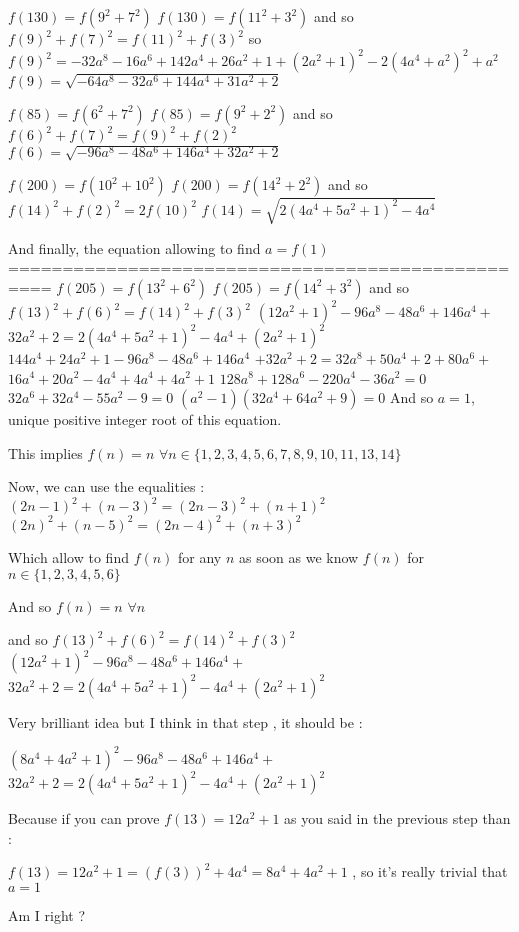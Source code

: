 \begin{solution}
$ f(130)=f(9^2+7^2)$
$ f(130)=f(11^2+3^2)$
and so $ f(9)^2+f(7)^2=f(11)^2+f(3)^2$
so $ f(9)^2=-32a^8-16a^6+142a^4+26a^2+1+(2a^2+1)^2-2(4a^4+a^2)^2+a^2$
$ f(9)=\sqrt{-64a^8-32a^6+144a^4+31a^2+2}$

$ f(85)=f(6^2+7^2)$
$ f(85)=f(9^2+2^2)$
and so $ f(6)^2+f(7)^2=f(9)^2+f(2)^2$
$ f(6)=\sqrt{-96a^8-48a^6+146a^4+32a^2+2}$

$ f(200)=f(10^2+10^2)$
$ f(200)=f(14^2+2^2)$
and so $ f(14)^2+f(2)^2=2f(10)^2$
$ f(14)=\sqrt{2(4a^4+5a^2+1)^2-4a^4}$

And finally, the equation allowing to find $ a=f(1)$
==================================================
$ f(205)=f(13^2+6^2)$
$ f(205)=f(14^2+3^2)$
and so $ f(13)^2+f(6)^2=f(14)^2+f(3)^2$
$ (12a^2+1)^2-96a^8-48a^6+146a^4+$ $ 32a^2+2=2(4a^4+5a^2+1)^2-4a^4+(2a^2+1)^2$
$ 144a^4+24a^2+1-96a^8-48a^6+146a^4$ $ +32a^2+2=32a^8+50a^4+2+80a^6+$ $ 16a^4+20a^2-4a^4+4a^4+4a^2+1$
$ 128a^8+128a^6-220a^4-36a^2=0$
$ 32a^6+32a^4-55a^2-9=0$
$ (a^2-1)(32a^4+64a^2+9)=0$
And so $ a=1$, unique positive integer root of this equation.

This implies $ f(n)=n$ $ \forall n\in\{1,2,3,4,5,6,7,8,9,10,11,13,14\}$

Now, we can use the equalities  :
$ (2n-1)^2+(n-3)^2=(2n-3)^2+(n+1)^2$
$ (2n)^2+(n-5)^2=(2n-4)^2+(n+3)^2$

Which allow to find $ f(n)$ for any $ n$ as soon as we know $ f(n)$ for $ n\in\{1,2,3,4,5,6\}$

And so $ \boxed{f(n)=n}$ $ \forall n$
\end{solution}



\begin{solution}
	\begin{tcolorbox} and so $ f(13)^2 + f(6)^2 = f(14)^2 + f(3)^2$
$ (12a^2 + 1)^2 - 96a^8 - 48a^6 + 146a^4 +$ $ 32a^2 + 2 = 2(4a^4 + 5a^2 + 1)^2 - 4a^4 + (2a^2 + 1)^2$


  \end{tcolorbox}

\begin{italicized}   Very brilliant idea    but I think in that step , it should be :

   $ ( 8a^4 + 4 a^2 + 1)^2 - 96a^8 - 48a^6 + 146a^4 +$ $ 32a^2 + 2 = 2(4a^4 + 5a^2 + 1)^2 - 4a^4 + (2a^2 + 1)^2$

   Because if you can prove $ f(13) = 12a^2 + 1$ as you said in the previous step than :

    $ f(13) = 12a^2 + 1 = (f(3))^2 + 4a^4 = 8a^4 + 4a^2 + 1$ , so it's really trivial that $ a = 1$
  
    Am I right ?
            
   \end{italicized}
\end{solution}




